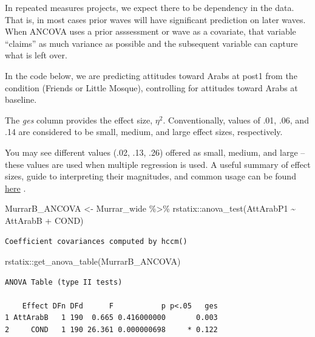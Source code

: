 \documentclass[
  11pt,
]{book}
\newenvironment{Shaded}{\begin{snugshade}}{\end{snugshade}}
\newcommand{\FunctionTok}[1]{\textcolor[rgb]{0.00,0.00,0.00}{#1}}
\newcommand{\NormalTok}[1]{#1}
\newcommand{\OtherTok}[1]{\textcolor[rgb]{0.56,0.35,0.01}{#1}}
\newcommand{\SpecialCharTok}[1]{\textcolor[rgb]{0.00,0.00,0.00}{#1}}
\begin{document}
In repeated measures projects, we expect there to be dependency in the data. That is, in most cases prior waves will have significant prediction on later waves. When ANCOVA uses a prior asssessment or wave as a covariate, that variable ``claims'' as much variance as possible and the subsequent variable can capture what is left over.

In the code below, we are predicting attitudes toward Arabs at post1 from the condition (Friends or Little Mosque), controlling for attitudes toward Arabs at baseline.

The \emph{ges} column provides the effect size, \(\eta^2\). Conventionally, values of .01, .06, and .14 are considered to be small, medium, and large effect sizes, respectively.

You may see different values (.02, .13, .26) offered as small, medium, and large -- these values are used when multiple regression is used. A useful summary of effect sizes, guide to interpreting their magnitudes, and common usage can be found \href{https://imaging.mrc-cbu.cam.ac.uk/statswiki/FAQ/effectSize}{here} \citep{watson_rules_2020}.

\begin{Shaded}
\begin{Highlighting}[]
\NormalTok{MurrarB\_ANCOVA }\OtherTok{\textless{}{-}}\NormalTok{ Murrar\_wide }\SpecialCharTok{\%\textgreater{}\%}
\NormalTok{    rstatix}\SpecialCharTok{::}\FunctionTok{anova\_test}\NormalTok{(AttArabP1 }\SpecialCharTok{\textasciitilde{}}\NormalTok{ AttArabB }\SpecialCharTok{+}\NormalTok{ COND)}
\end{Highlighting}
\end{Shaded}

\begin{verbatim}
Coefficient covariances computed by hccm()
\end{verbatim}

\begin{Shaded}
\begin{Highlighting}[]
\NormalTok{rstatix}\SpecialCharTok{::}\FunctionTok{get\_anova\_table}\NormalTok{(MurrarB\_ANCOVA)}
\end{Highlighting}
\end{Shaded}

\begin{verbatim}
ANOVA Table (type II tests)

    Effect DFn DFd      F           p p<.05   ges
1 AttArabB   1 190  0.665 0.416000000       0.003
2     COND   1 190 26.361 0.000000698     * 0.122
\end{verbatim}
\end{document}
